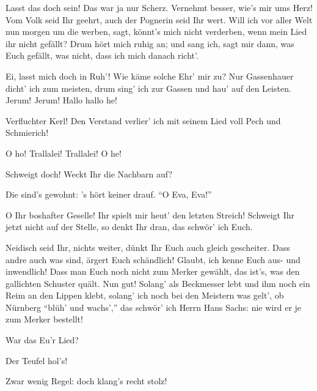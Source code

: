 \begin{drama}
\Beckmesserspeaks


Lasst das doch sein! Das war ja nur Scherz.
Vernehmt besser, wie's mir ums Herz!
Vom Volk seid Ihr geehrt,
auch der Pognerin seid Ihr wert.
Will ich vor aller Welt
nun morgen um die werben,
sagt, könnt's mich nicht verderben,
wenn mein Lied ihr nicht gefällt?
Drum hört mich ruhig an;
und sang ich, sagt mir dann,
was Euch gefällt, was nicht,
dass ich mich danach richt'.


\Sachsspeaks
Ei, lasst mich doch in Ruh'!
Wie käme solche Ehr' mir zu?
Nur Gassenhauer dicht' ich zum meisten,
drum sing' ich zur Gassen und hau' auf den Leisten.
Jerum! Jerum!
Hallo hallo he!

\Beckmesserspeaks
Verfluchter Kerl! Den Verstand verlier' ich
mit seinem Lied voll Pech und Schmierich!

\Sachsspeaks
O ho! Trallalei! Trallalei! O he!

\Beckmesserspeaks
Schweigt doch! Weckt Ihr die Nachbarn auf?

\Sachsspeaks
Die sind's gewohnt:
's hört keiner drauf.
``O Eva, Eva!''

\Beckmesserspeaks


O Ihr boshafter Geselle!
Ihr spielt mir heut' den letzten Streich!
Schweigt Ihr jetzt nicht auf der Stelle,
so denkt Ihr dran, das schwör' ich Euch.


Neidisch seid Ihr, nichts weiter,
dünkt Ihr Euch auch gleich gescheiter.
Dass andre auch was sind, ärgert Euch schändlich!
Glaubt, ich kenne Euch aus- und inwendlich!
Dass man Euch noch nicht zum Merker gewählt,
das ist's, was den gallichten Schuster quält.
Nun gut! Solang' als Beckmesser lebt
und ihm noch ein Reim an den Lippen klebt,
solang' ich noch bei den Meistern was gelt',
ob Nürnberg ``blüh' und wachs',''
das schwör' ich Herrn Hans Sachs:
nie wird er je zum Merker bestellt!



\Sachsspeaks


War das Eu'r Lied?

\Beckmesserspeaks
Der Teufel hol's!

\Sachsspeaks
Zwar wenig Regel:
doch klang's recht stolz!


\end{drama}
